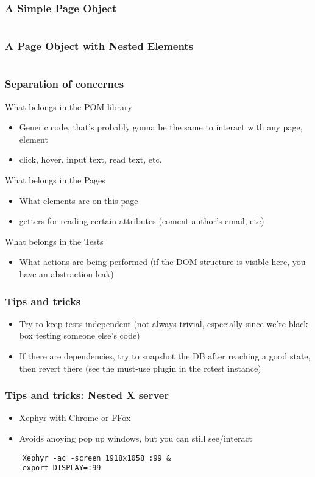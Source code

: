 \documentclass{beamer}
\begin{document}
\begin{frame}
  \frametitle{A Simple Page Object}
  \inputminted[fontsize=\footnotesize]{python}{snippets/pom1.py}
\end{frame}

\begin{frame}
  \frametitle{A Page Object with Nested Elements}
  \inputminted[fontsize=\footnotesize]{python}{snippets/pom2.py}
\end{frame}

\begin{frame}
  \frametitle{Separation of concernes}
  What belongs in the POM library
  \begin{itemize}
  \item Generic code, that's probably gonna be the same to interact with any page, element
  \item click, hover, input text, read text, etc.
  \end{itemize}
  \vspace{10pt}
  What belongs in the Pages
  \begin{itemize}
  \item What elements are on this page
  \item getters for reading certain attributes (coment author's email, etc)
  \end{itemize}
  \vspace{10pt}
  What belongs in the Tests
  \begin{itemize}
  \item What actions are being performed (if the DOM structure is visible here, you have an abstraction leak)
  \end{itemize}
\end{frame}

\begin{frame}
  \frametitle{Tips and tricks}
  \begin{itemize}
  \item Try to keep tests independent (not always trivial, especially since we're black box testing someone else's code)
  \item If there are dependencies, try to snapshot the DB after reaching a good state, then revert there (see the must-use plugin in the rctest instance)
  \end{itemize}
\end{frame}

\begin{frame}[fragile]
  \frametitle{Tips and tricks: Nested X server}
  \begin{itemize}
  \item Xephyr with Chrome or FFox
  \item Avoids anoying pop up windows, but you can still see/interact
  \end{itemize}
  \begin{verbatim}
    Xephyr -ac -screen 1918x1058 :99 &
    export DISPLAY=:99
\end{verbatim}
\end{frame}
\end{document}
